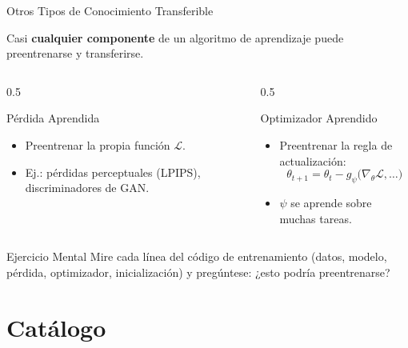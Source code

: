 \documentclass[aspectratio=169, 10pt]{beamer}
\begin{document}
\begin{frame}{Otros Tipos de Conocimiento Transferible}

	Casi \textbf{cualquier componente} de un algoritmo de aprendizaje puede preentrenarse y transferirse.

	\vspace{0.3cm}

	\begin{columns}[T]
		\begin{column}{0.5\textwidth}
			\begin{block}{P\'erdida Aprendida}
				\small
				\begin{itemize}
					\item Preentrenar la propia funci\'on $\mathcal{L}$.
					\item Ej.: p\'erdidas perceptuales (LPIPS), discriminadores de GAN.
				\end{itemize}
			\end{block}
		\end{column}

		\begin{column}{0.5\textwidth}
			\begin{block}{Optimizador Aprendido}
				\small
				\begin{itemize}
					\item Preentrenar la regla de actualizaci\'on:
					\[
					\theta_{t+1} = \theta_t - g_\psi\big(\nabla_\theta \mathcal{L}, \ldots\big)
					\]
					\item $\psi$ se aprende sobre muchas tareas.
				\end{itemize}
			\end{block}
		\end{column}
	\end{columns}

	\vspace{0.4cm}

	\begin{alertblock}{Ejercicio Mental}
		Mire cada l\'inea del c\'odigo de entrenamiento (datos, modelo, p\'erdida, optimizador, inicializaci\'on) y preg\'untese: ¿esto podr\'ia preentrenarse?
	\end{alertblock}

\end{frame}

\section{Cat\'alogo}
\end{document}
